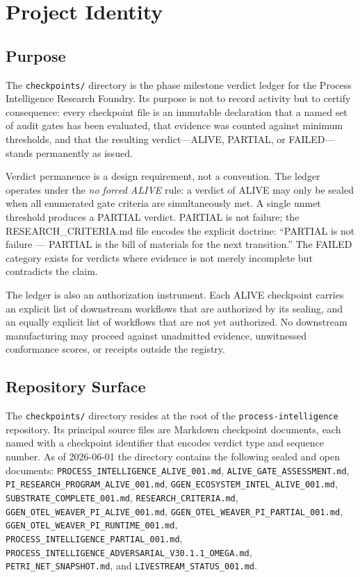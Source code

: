 \section{Project Identity}
\label{sec:checkpoints-identity}

\subsection{Purpose}
\label{sec:checkpoints-identity-purpose}

The \texttt{checkpoints/} directory is the phase milestone verdict ledger for the Process Intelligence Research
Foundry. Its purpose is not to record activity but to certify consequence: every checkpoint file is an
immutable declaration that a named set of audit gates has been evaluated, that evidence was counted against
minimum thresholds, and that the resulting verdict---ALIVE, PARTIAL, or FAILED---stands permanently as issued.

Verdict permanence is a design requirement, not a convention. The ledger operates under the
\emph{no forced ALIVE} rule: a verdict of ALIVE may only be sealed when all enumerated gate criteria
are simultaneously met. A single unmet threshold produces a PARTIAL verdict. PARTIAL is not failure;
the RESEARCH\_CRITERIA.md file encodes the explicit doctrine: \textquotedblleft PARTIAL is not failure
--- PARTIAL is the bill of materials for the next transition.\textquotedblright{} The FAILED category
exists for verdicts where evidence is not merely incomplete but contradicts the claim.

The ledger is also an authorization instrument. Each ALIVE checkpoint carries an explicit list of
downstream workflows that are authorized by its sealing, and an equally explicit list of workflows
that are not yet authorized. No downstream manufacturing may proceed against unadmitted evidence,
unwitnessed conformance scores, or receipts outside the registry.

\subsection{Repository Surface}
\label{sec:checkpoints-identity-surface}

The \texttt{checkpoints/} directory resides at the root of the \texttt{process-intelligence} repository.
Its principal source files are Markdown checkpoint documents, each named with a checkpoint identifier
that encodes verdict type and sequence number. As of 2026-06-01 the directory contains the following
sealed and open documents: \texttt{PROCESS\_INTELLIGENCE\_ALIVE\_001.md}, \texttt{ALIVE\_GATE\_ASSESSMENT.md},
\texttt{PI\_RESEARCH\_PROGRAM\_ALIVE\_001.md}, \texttt{GGEN\_ECOSYSTEM\_INTEL\_ALIVE\_001.md},
\texttt{SUBSTRATE\_COMPLETE\_001.md}, \texttt{RESEARCH\_CRITERIA.md},
\texttt{GGEN\_OTEL\_WEAVER\_PI\_ALIVE\_001.md}, \texttt{GGEN\_OTEL\_WEAVER\_PI\_PARTIAL\_001.md},
\texttt{GGEN\_OTEL\_WEAVER\_PI\_RUNTIME\_001.md}, \texttt{PROCESS\_INTELLIGENCE\_PARTIAL\_001.md},
\texttt{PROCESS\_INTELLIGENCE\_ADVERSARIAL\_V30.1.1\_OMEGA.md}, \texttt{PETRI\_NET\_SNAPSHOT.md}, and
\texttt{LIVESTREAM\_STATUS\_001.md}.

